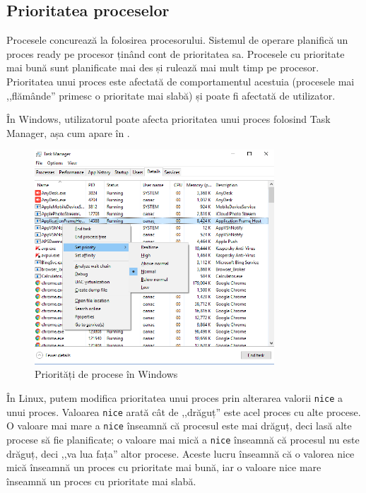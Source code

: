 \subsection{Prioritatea proceselor}
\label{sec:process-resurse-prioritate}

Procesele concurează la folosirea procesorului. Sistemul de operare planifică un
proces ready pe procesor ținând cont de prioritatea sa. Procesele cu prioritate
mai bună sunt planificate mai des și rulează mai mult timp pe procesor.
Prioritatea unui proces este afectată de comportamentul acestuia (procesele mai
,,flămânde'' primesc o prioritate mai slabă) și poate fi afectată de utilizator.

În Windows, utilizatorul poate afecta prioritatea unui proces folosind Task Manager, așa cum apare în .

\begin{figure}[!htbp]
	\centering
	\includegraphics[width=0.8\textwidth]{chapters/04-process/img/task-manager-priority.png}
	\caption{Priorități de procese în Windows}
	\label{fig:process-priority-task-manager}
\end{figure}

În Linux, putem modifica prioritatea unui proces prin alterarea valorii \texttt{nice} a
unui proces. Valoarea \texttt{nice} arată cât de ,,drăguț'' este acel proces cu alte
procese. O valoare mai mare a \texttt{nice} înseamnă că procesul este mai drăguț, deci
lasă alte procese să fie planificate; o valoare mai mică a \texttt{nice} înseamnă că
procesul nu este drăguț, deci ,,va lua fața'' altor procese. Aceste lucru înseamnă
că o valorea nice mică înseamnă un proces cu prioritate mai bună, iar o valoare
nice mare înseamnă un proces cu prioritate mai slabă.

